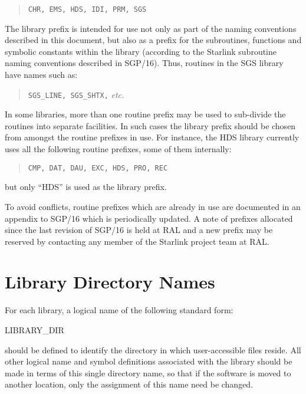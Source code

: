 \documentclass[noabs,11pt,nolof]{starlink}
\begin{document}
\begin{quote}
\begin{center}
\texttt{CHR, EMS, HDS, IDI, PRM, SGS}
\end{center}
\end{quote}

The library prefix is intended for use not only as part of the naming
conventions described in this document, but also as a prefix for the
subroutines, functions and symbolic constants within the library (according
to the Starlink subroutine naming conventions described in SGP/16).
Thus, routines in the SGS library have names such as:

\begin{quote}
\begin{center}
\texttt{SGS\_LINE, SGS\_SHTX,} \emph{etc.}
\end{center}
\end{quote}

In some libraries, more than one routine prefix may be used to sub-divide
the routines into separate facilities.
In such cases the library prefix should be chosen from amongst the
routine prefixes in use.
For instance, the HDS library currently uses all the following routine prefixes,
some of them internally:

\begin{quote}
\begin{center}
\texttt{CMP, DAT, DAU, EXC, HDS, PRO, REC}
\end{center}
\end{quote}

but only ``HDS'' is used as the library prefix.

To avoid conflicts, routine prefixes which are already in use are documented
in an appendix to SGP/16 which is periodically updated.
A note of prefixes allocated since the last revision of SGP/16 is held at
RAL and a new prefix may be reserved by contacting any member of the
Starlink project team at RAL.

\section{Library Directory Names}

For each library, a logical name of the following standard form:

\begin{terminalv}
LIBRARY_DIR
\end{terminalv}

should be defined to identify the directory in which user-accessible files
reside.
All other logical name and symbol definitions associated with the library
should be made in terms of this single directory name, so that if the
software is moved to another location, only the assignment of this name need
be changed.
\end{document}
